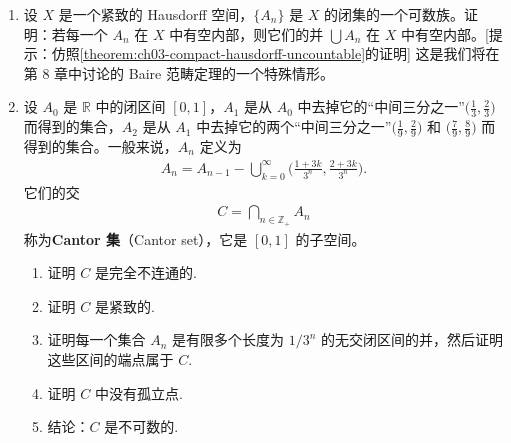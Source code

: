 \begin{enumerate}
\item 设 $X$ 是一个紧致的 Hausdorff 空间，$\{A_{n}\}$ 是 $X$ 的闭集的一个可数族。证明：若每一个 $A_{n}$ 在 $X$ 中有空内部，则它们的并 $\bigcup A_{n}$ 在 $X$ 中有空内部。[提示：仿照\cref{theorem:ch03-compact-hausdorff-uncountable}的证明] 这是我们将在第 8 章中讨论的 Baire 范畴定理的一个特殊情形。
\item 设 $A_{0}$ 是 $\mathbb{R}$ 中的闭区间 $[0,1]$，$A_{1}$ 是从 $A_{0}$ 中去掉它的``中间三分之一''$\big(\frac{1}{3},\frac{2}{3}\big)$ 而得到的集合，$A_{2}$ 是从 $A_{1}$ 中去掉它的两个``中间三分之一''$\big(\frac{1}{9},\frac{2}{9}\big)$ 和 $\big(\frac{7}{9},\frac{8}{9}\big)$ 而得到的集合。一般来说，$A_{n}$ 定义为
\begin{align*}
A_{n}=A_{n-1}-\bigcup_{k=0}^{\infty}\Big(\frac{1+3k}{3^{n}},\frac{2+3k}{3^{n}}\Big).
\end{align*}
它们的交
\begin{align*}
C=\bigcap_{n\in\mathbb{Z}_{+}}A_{n}
\end{align*}
称为\textbf{Cantor 集}（Cantor set），它是 $[0,1]$ 的子空间。
\begin{enumerate}
\item 证明 $C$ 是完全不连通的.
\item 证明 $C$ 是紧致的.
\item 证明每一个集合 $A_{n}$ 是有限多个长度为 $1/3^{n}$ 的无交闭区间的并，然后证明这些区间的端点属于 $C$.
\item 证明 $C$ 中没有孤立点.
\item 结论：$C$ 是不可数的.
\end{enumerate}
\end{enumerate}